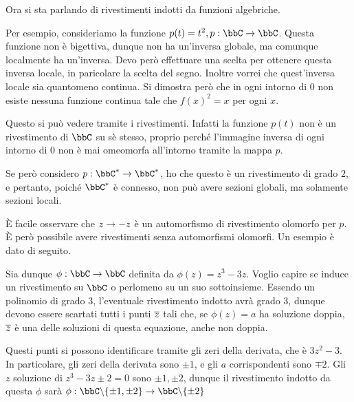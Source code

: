 Ora si sta parlando di rivestimenti indotti da funzioni algebriche.

Per esempio, consideriamo la funzione $p(t)=t^2, p:\bbC\rar\bbC$. Questa funzione non è bigettiva, dunque non ha un'inversa globale, ma comunque localmente ha un'inversa. Devo però effettuare una scelta per ottenere questa inversa locale, in paricolare la scelta del segno. Inoltre vorrei che quest'inversa locale sia quantomeno continua. Si dimostra però che in ogni intorno di $0$ non esiste nessuna funzione continua tale che $f(x)^2=x$ per ogni $x$.

Questo si può vedere tramite i rivestimenti. Infatti la funzione $p(t)$ non è un rivestimento di $\bbC$ su sè stesso, proprio perché l'immagine inversa di ogni intorno di $0$ non è mai omeomorfa all'intorno tramite la mappa $p$.

Se però considero $p:\bbC^*\rar\bbC^*$, ho che questo è un rivestimento di grado $2$, e pertanto, poiché $\bbC^*$ è connesso, non può avere sezioni globali, ma solamente sezioni locali.

È facile osservare che $z\rightarrow-z$ è un automorfismo di rivestimento olomorfo per $p$. È però possibile avere rivestimenti senza automorfismi olomorfi. Un esempio è dato di seguito.

Sia dunque $\phi:\bbC\rar\bbC$ definita da $\phi(z)=z^3-3z$. Voglio capire se induce un rivestimento su $\bbC$ o perlomeno su un suo sottoinsieme.
Essendo un polinomio di grado $3$, l'eventuale rivestimento indotto avrà grado $3$, dunque devono essere scartati tutti i punti $\overline{z}$ tali che, se $\phi(z)=a$ ha soluzione doppia, $\overline{z}$ è una delle soluzioni di questa equazione, anche non doppia.

Questi punti si possono identificare tramite gli zeri della derivata, che è $3z^2-3$. In particolare, gli zeri della derivata sono $\pm1$, e gli $a$ corrispondenti sono $\mp2$. Gli $z$ soluzione di $z^3-3z\pm2=0$ sono $\pm1,\pm2$, dunque il rivestimento indotto da questa $\phi$ sarà $\phi:\bbC\minus\{\pm1,\pm2\}\rar\bbC\minus\{\pm2\}$


